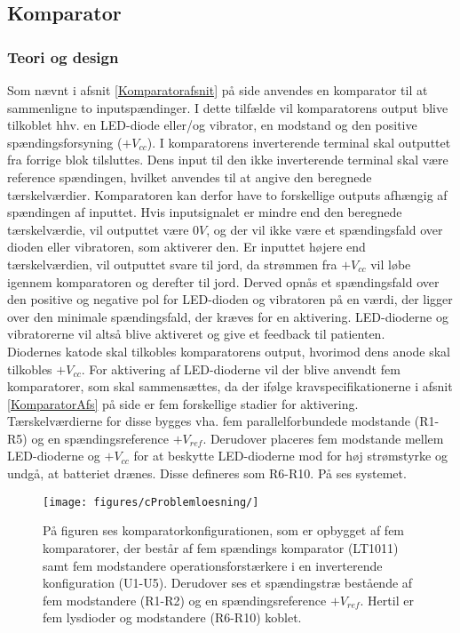 \subsection{Komparator}
\subsubsection{Teori og design}
Som nævnt i afsnit \ref{Komparatorafsnit} på side \pageref{Komparatorafsnit} anvendes en komparator til at sammenligne to inputspændinger. I dette tilfælde vil komparatorens output blive tilkoblet hhv. en LED-diode eller/og vibrator, en modstand og den positive spændingsforsyning ($+V_{cc}$). I komparatorens inverterende terminal skal outputtet fra forrige blok tilsluttes. Dens input til den ikke inverterende terminal skal være reference spændingen, hvilket anvendes til at angive den beregnede tærskelværdier. Komparatoren kan derfor have to forskellige outputs afhængig af spændingen af inputtet. Hvis inputsignalet er mindre end den beregnede tærskelværdie, vil outputtet være $0V$, og der vil ikke være et spændingsfald over dioden eller vibratoren, som aktiverer den. Er inputtet højere end tærskelværdien, vil outputtet svare til jord, da strømmen fra $+V_{cc}$ vil løbe igennem komparatoren og derefter til jord. Derved opnås et spændingsfald over den positive og negative pol for LED-dioden og vibratoren på en værdi, der ligger over den minimale spændingsfald, der kræves for en aktivering. LED-dioderne og vibratorerne vil altså blive aktiveret og give et feedback til patienten. \\
Diodernes katode skal tilkobles komparatorens output, hvorimod dens anode skal tilkobles $+V_{cc}$. For aktivering af LED-dioderne vil der blive anvendt fem komparatorer, som skal sammensættes, da der ifølge kravspecifikationerne i afsnit \ref{KomparatorAfs} på side \pageref{KomparatorAfs} er fem forskellige stadier for aktivering. Tærskelværdierne for disse bygges vha. fem parallelforbundede modstande (R1-R5) og en spændingsreference $+V_{ref}$. Derudover placeres fem modstande mellem LED-dioderne og $+V_{cc}$ for at beskytte LED-dioderne mod for høj strømstyrke og undgå, at batteriet drænes. Disse defineres som R6-R10. På  ses systemet.\\

\begin{figure}[H]
	\centering 
	\texttt{[image: figures/cProblemloesning/]}
	\caption{På figuren ses komparatorkonfigurationen, som er opbygget af fem komparatorer, der består af fem spændings komparator (LT1011) samt fem modstandere operationsforstærkere i en inverterende konfiguration (U1-U5). Derudover ses et spændingstræ bestående af fem modstandere (R1-R2) og en spændingsreference $+V_{ref}$. Hertil er fem lysdioder og modstandere (R6-R10) koblet. }
	\label{Fig:grund_kompar}
\end{figure}

